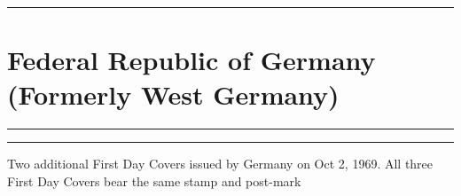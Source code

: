 \documentclass[a4paper]{article}
\begin{document}
  \hrule
\section*{Federal Republic of Germany {\small (Formerly West Germany)}}
\vspace{8pt}
\hrule
\vspace{21cm}
\begin{center}
  \begin{minipage}{12cm} \hrule \vspace{12pt} Two additional First Day
    Covers issued by Germany on Oct 2, 1969. All three First Day
    Covers bear the same stamp and post-mark
\end{minipage}
\end{center}

\end{document}

